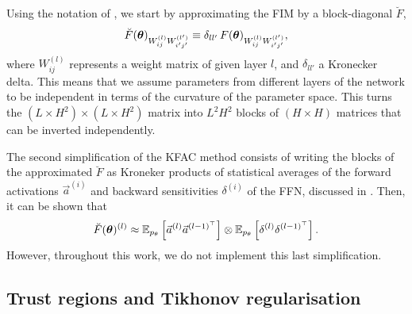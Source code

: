 Using the notation of \cite{drissi2024second}, we start by approximating the FIM by a block-diagonal $\breve{F}$,
\begin{align}
    \breve{F}(\boldsymbol{\theta})_{W_{ij}^{(l)}{W^{(l')}_{i'j'}}} \equiv \delta_{ll'}\, F(\boldsymbol{\theta})_{W_{ij}^{(l)}{W^{(l')}_{i'j'}}},
\end{align}
where $W_{ij}^{(l)}$ represents a weight matrix of given layer $l$, and $\delta_{ll'}$ a Kronecker delta. This means that we assume parameters from different layers of the network to be independent in terms of the curvature of the parameter space. This turns the $(L \times H^2) \times (L \times H^2)$ matrix into $L^2  H^2$ blocks of $(H\times H)$ matrices that can be inverted independently.

The second simplification of the KFAC method consists of writing the blocks of the approximated $\breve{F}$ as Kroneker products of statistical averages of the forward activations $\Vec{a}^{(i)}$ and backward sensitivities $\delta^{(i)}$ of the FFN, discussed in . Then, it can be shown that 
\begin{align}
    \breve{F}(\boldsymbol{\theta})^{(l)} \approx \mathbb{E}_{p_\theta}\left[\Vec{a}^{(l)}\Vec{a}^{(l-1)^\top}\right]\otimes\mathbb{E}_{p_\theta}\left[\delta^{(l)}\delta^{(l-1)^\top}\right].
\end{align}
However, throughout this work, we do not implement this last simplification.

\subsection{Trust regions and Tikhonov regularisation}

